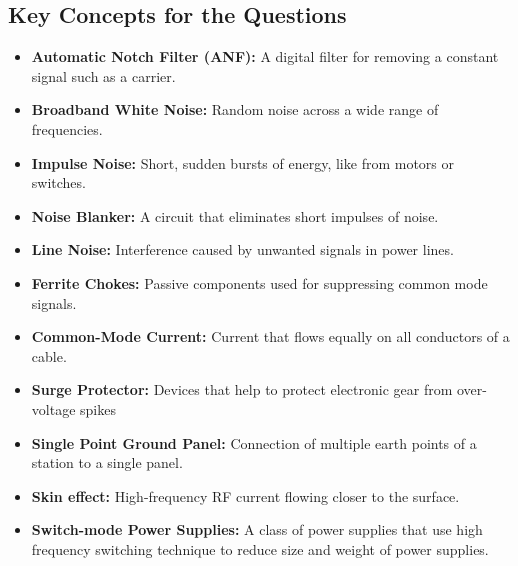 \subsection*{Key Concepts for the Questions}
\begin{itemize}
        \item \textbf{Automatic Notch Filter (ANF):} A digital filter for removing a constant signal such as a carrier.
     \item  \textbf{Broadband White Noise:} Random noise across a wide range of frequencies.
         \item  \textbf{Impulse Noise:} Short, sudden bursts of energy, like from motors or switches.
         \item \textbf{Noise Blanker:} A circuit that eliminates short impulses of noise.
        \item \textbf{Line Noise:}  Interference caused by unwanted signals in power lines.
         \item  \textbf{Ferrite Chokes:} Passive components used for suppressing common mode signals.
      \item \textbf{Common-Mode Current:} Current that flows equally on all conductors of a cable.
       \item \textbf{Surge Protector:} Devices that help to protect electronic gear from over-voltage spikes
       \item \textbf{Single Point Ground Panel:} Connection of multiple earth points of a station to a single panel.
       \item \textbf{Skin effect:} High-frequency RF current flowing closer to the surface.
      \item \textbf{Switch-mode Power Supplies:} A class of power supplies that use high frequency switching technique to reduce size and weight of power supplies.
\end{itemize}

